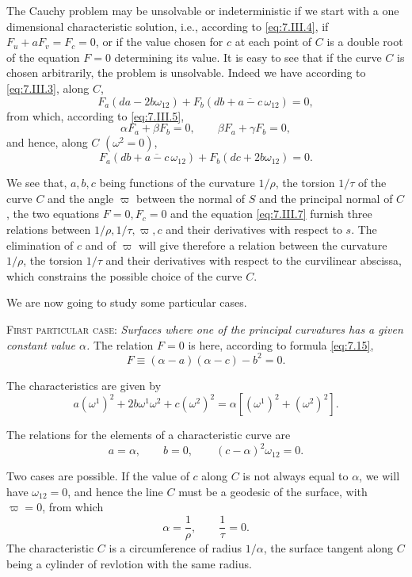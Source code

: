\documentclass[leqno,11pt]{book}
\numberwithin{equation}{chapter}
\theoremstyle{shape1}
\theoremstyle{shape0}
\theoremstyle{shape2}
\theoremstyle{definition}
\begin{document}
The Cauchy problem may be unsolvable or indeterministic if we start with a one dimensional characteristic solution, i.e., according to \eqref{eq:7.III.4}, if $F_{u}+aF_{v}=F_{c}=0$, or if the value chosen for $c$ at each point of $C$ is a double root of the equation $F=0$ determining its value. It is easy to see that if the curve $C$ is chosen arbitrarily, the problem is unsolvable. Indeed we have according to \eqref{eq:7.III.3}, along $C$,
\begin{equation}
  \label{eq:7.III.6}\tag{III, 6}
  F_{a}(da-2b\omega_{12})+F_{b}(db+\overline{a-c}\,\omega_{12})=0,
\end{equation}
from which, according to \eqref{eq:7.III.5},
\[
  \alpha F_{a}+\beta F_{b}=0,\qquad \beta F_{a}+\gamma F_{b}=0,
\]
and hence, along $C$ $(\omega^{2}=0)$,
\begin{equation}
  \label{eq:7.III.7}\tag{III, 7}
  F_{a}(db+\overline{a-c}\,\omega_{12})+F_{b}(dc+2b\omega_{12})=0.
\end{equation}

We see that, $a, b, c$ being functions of the curvature $1/\rho$, the torsion $1/\tau$ of the curve $C$ and the angle $\varpi$ between the normal of $S$ and the principal normal of $C$, the two equations $F=0,F_{c}=0$ and the equation \eqref{eq:7.III.7} furnish three relations between $1/\rho,1/\tau,\varpi,c$ and their derivatives with respect to $s$. The elimination of $c$ and of $\varpi$ will give therefore a relation between the curvature $1/\rho$, the torsion $1/\tau$ and their derivatives with respect to the curvilinear abscissa, which constrains the possible choice of the curve $C$.

We are now going to study some particular cases.




\vspace{12pt}\fsec \textsc{First particular case:} \emph{Surfaces where one of the principal curvatures has a given constant value $\alpha$.} The relation $F=0$ is here, according to formula \eqref{eq:7.15},
\[
F\equiv (\alpha-a)(\alpha-c)-b^{2}=0.
\]

The characteristics are given by
\[
a(\omega^{1})^{2}+2b\omega^{1}\omega^{2}+c(\omega^{2})^{2}=\alpha[(\omega^{1})^{2}+(\omega^{2})^{2}].
\]

The relations for the elements of a characteristic curve are
\[
a=\alpha,\qquad b=0,\qquad(c-\alpha)^{2}\omega_{12}=0.
\]

Two cases are possible. If the value of $c$ along $C$ is not always equal to $\alpha$, we will have $\omega_{12}=0$, and hence the line $C$ must be a geodesic of the surface, with $\varpi=0$, from which
\[
\alpha=\frac{1}{\rho},\qquad\frac{1}{\tau}=0.
\]
The characteristic $C$ is a circumference of radius $1/\alpha$, the surface tangent along $C$ being a cylinder of revlotion with the same radius.
\end{document}
